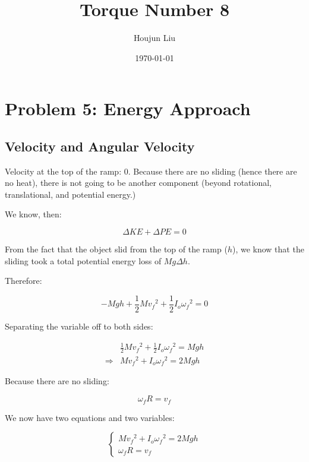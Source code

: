 \documentclass[letterpaper]{article}
\author{Houjun Liu}
\date{\today}
\title{Torque Number 8}
\renewcommand{\tableofcontents}{}
\renewcommand\maketitle{}
\begin{document}
\maketitle
\tableofcontents


\section{Problem 5: Energy Approach}
\label{sec:org054d4a8}

\subsection{Velocity and Angular Velocity}
\label{sec:orgcb5e9e1}
Velocity at the top of the ramp: \(0\). Because there are no sliding (hence there are no heat), there is not going to be another component (beyond rotational, translational, and potential energy.)

We know, then:

\begin{equation}
   \Delta KE +\Delta PE = 0 
\end{equation}

From the fact that the object slid from the top of the ramp (\(h\)), we know that the sliding took a total potential energy loss of \(Mg\Delta h\). 

Therefore:

\begin{equation}
   -Mgh + \frac{1}{2} M{v_f}^2 + \frac{1}{2}I_o {\omega_f}^2 = 0
\end{equation}

Separating the variable off to both sides:

\begin{align}
    &\frac{1}{2} M{v_f}^2 + \frac{1}{2}I_o {\omega_f}^2 = Mgh\\
\Rightarrow & M{v_f}^2 + I_o {\omega_f}^2 = 2 Mgh
\end{align}

Because there are no sliding:

\begin{equation}
   {\omega_f} R = v_f
\end{equation}

We now have two equations and two variables:

\begin{equation}
   \begin{cases}
    M{v_f}^2 + I_o {\omega_f}^2 = 2 Mgh\\
   {\omega_f} R = v_f
\end{cases}
\end{equation}
\end{document}
